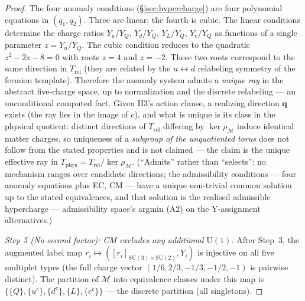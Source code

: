\documentclass[11pt]{article}
\theoremstyle{definition}
\newcommand{\SU}{\mathrm{SU}}
\newcommand{\U}{\mathrm{U}}
\begin{document}
\begin{proof}
The four anomaly conditions (\S\ref{sec:hypercharge}) are four
polynomial equations in $(q_1, q_2)$.  Three are linear; the
fourth is cubic.  The linear conditions determine the charge
ratios $Y_u/Y_Q$, $Y_d/Y_Q$, $Y_L/Y_Q$, $Y_e/Y_Q$
as functions of a single parameter $z = Y_u/Y_Q$.  The cubic
condition reduces to the quadratic $z^2 - 2z - 8 = 0$ with roots
$z = 4$ and $z = -2$.  These two roots correspond to the same
direction in $T_{\mathrm{rel}}$ (they are related by the
$u \leftrightarrow d$ relabeling symmetry of the fermion template).
Therefore the anomaly system admits a \emph{unique ray} in the
abstract five-charge space, up to normalization and the discrete
relabeling --- an unconditional computed fact.  Given H3's action
clause, a realizing direction $\mathbf{q}$ exists (the ray lies in
the image of $c$), and what is unique is its class in the physical
quotient: distinct directions of $T_{\mathrm{rel}}$ differing by
$\ker\rho_{\mathcal{M}}$ induce identical matter charges, so
uniqueness of a \emph{subgroup of the unquotiented torus} does not
follow from the stated properties and is not claimed --- the claim is
the unique effective ray in
$T_{\mathrm{phys}} = T_{\mathrm{rel}} / \ker\rho_{\mathcal{M}}$.  (``Admits'' rather than ``selects'': no
mechanism ranges over candidate directions; the admissibility
conditions --- four anomaly equations plus EC, CM --- have a unique
non-trivial common solution up to the stated equivalences, and
that solution is the realised admissible hypercharge --- admissibility
space's argmin (A2) on the Y-assignment alternatives.)

\textit{Step 5 (No second factor): CM excludes any additional
$\U(1)$.}\quad
After Step~3, the augmented label map
$r_i \mapsto ([r_i]_{\SU(3) \times \SU(2)}, Y_i)$ is injective on
all five multiplet types (the full charge vector
$(1/6, 2/3, -1/3, -1/2, -1)$ is pairwise distinct).  The partition of
$\mathcal{M}$ into equivalence classes under this map is
$\{\{Q\}, \{u^c\}, \{d^c\}, \{L\}, \{e^c\}\}$ --- the discrete
partition (all singletons).


\end{proof}
\end{document}

